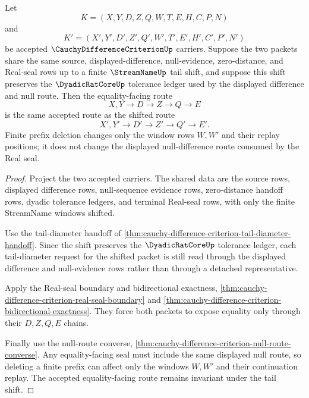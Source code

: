 \begin{theorem}
\label{thm:cauchy-difference-criterion-shift-invariance}
Let
$$
K=(X,Y,D,Z,Q,W,T,E,H,C,P,N)
$$
and
$$
K'=(X',Y',D',Z',Q',W',T',E',H',C',P',N')
$$
be accepted $\CauchyDifferenceCriterionUp$ carriers. Suppose the two packets share the same source, displayed-difference, null-evidence, zero-distance, and Real-seal rows up to a finite $\StreamNameUp$ tail shift, and suppose this shift preserves the $\DyadicRatCoreUp$ tolerance ledger used by the displayed difference and null route. Then the equality-facing route
$$
X,Y \longrightarrow D \longrightarrow Z \longrightarrow Q \longrightarrow E
$$
is the same accepted route as the shifted route
$$
X',Y' \longrightarrow D' \longrightarrow Z' \longrightarrow Q' \longrightarrow E' .
$$
Finite prefix deletion changes only the window rows $W,W'$ and their replay positions; it does not change the displayed null-difference route consumed by the Real seal.
\end{theorem}
\begin{proof}
Project the two accepted carriers. The shared data are the source rows, displayed difference rows, null-sequence evidence rows, zero-distance handoff rows, dyadic tolerance ledgers, and terminal Real-seal rows, with only the finite StreamName windows shifted.

Use the tail-diameter handoff of \autoref{thm:cauchy-difference-criterion-tail-diameter-handoff}. Since the shift preserves the $\DyadicRatCoreUp$ tolerance ledger, each tail-diameter request for the shifted packet is still read through the displayed difference and null-evidence rows rather than through a detached representative.

Apply the Real-seal boundary and bidirectional exactness, \autoref{thm:cauchy-difference-criterion-real-seal-boundary} and \autoref{thm:cauchy-difference-criterion-bidirectional-exactness}. They force both packets to expose equality only through their $D,Z,Q,E$ chains.

Finally use the null-route converse, \autoref{thm:cauchy-difference-criterion-null-route-converse}. Any equality-facing seal must include the same displayed null route, so deleting a finite prefix can affect only the windows $W,W'$ and their continuation replay. The accepted equality-facing route remains invariant under the tail shift.
\end{proof}

